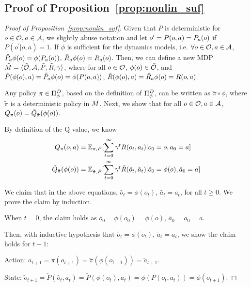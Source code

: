 \subsection{Proof of Proposition~\ref{prop:nonlin_suf}}
\label{proof:nonlin_suf}
\begin{proof}[Proof of Proposition~\ref{prop:nonlin_suf}]

Given that $P$ is deterministic for $o\in\mathcal{O}, a\in\mathcal{A}$, we slightly abuse notation and let $o^\prime = P(o,a) = P_a(o)$ if $P(o^\prime|o,a)=1$.
If $\phi$ is sufficient for the dynamics models, i.e. $\forall o\in\mathcal{O}, a\in\mathcal{A}$, $\hat{P}_a \phi(o) = \phi(P_a(o))$, $\hat{R}_a \phi(o) = R_a(o)$.
Then, we can define a new MDP $\tilde{M} = \langle \tilde{\mathcal{O}}, \mathcal{A}, \tilde{P}, \tilde{R}, \gamma \rangle$, where for all $o\in\mathcal{O}$, $\phi(o)\in\tilde{\mathcal{O}}$, and
$\tilde{P}(\phi(o),a) = \hat{P}_a\phi(o) = \phi(P(o,a))$, $\tilde{R}(\phi(o),a) = \hat{R}_a \phi(o) = R(o,a)$. 

Any policy $\pi\in\Pi_{\phi}^D$, based on the definition of $\Pi_{\phi}^D$, can be written as $\tilde{\pi}\circ\phi$, where $\tilde{\pi}$ is a deterministic policy in $\tilde{M}$.
Next, we show that for all $o\in\mathcal{O}, a\in\mathcal{A}$, $Q_\pi(o)=\tilde{Q}_{\tilde{\pi}}(\phi(o))$.

By definition of the Q value, we know 
\begin{align}
    Q_\pi(o,a) &= \mathbb{E}_{\pi,P}[\sum_{t=0}^\infty \gamma^t R(o_t, a_t)|o_0=o, a_0=a] \label{eq:q_original}\\
    \tilde{Q}_{\tilde{\pi}}(\phi(o)) 
    &= \mathbb{E}_{\tilde{\pi},\tilde{P}}[\sum_{t=0}^\infty \gamma^t \tilde{R}(\tilde{o}_t, \tilde{a}_t)| \tilde{o}_0=\phi(o), \tilde{a}_0=a] \label{eq:q_induced}
\end{align}

We claim that in the above equations, $\tilde{o_t} = \phi(o_t)$, $\tilde{a_t}=a_t$, for all $t\geq 0$. We prove the claim by induction.

When $t=0$, the claim holds as $\tilde{o_0}=\phi(o_0)=\phi(o)$, $\tilde{a_0}=a_0=a$.

Then, with inductive hypothesis that $\tilde{o_t} = \phi(o_t)$, $\tilde{a_t}=a_t$, we show the claim holds for $t+1$:

Action:
$a_{t+1} = \pi(o_{t+1}) = \tilde{\pi}(\phi(o_{t+1})) = \tilde{a}_{t+1}$.

State: $\tilde{o}_{t+1} = \tilde{P}(\tilde{o_t},a_t) = \tilde{P}(\phi(o_t),a_t) = \phi(P(o_t,a_t)) = \phi(o_{t+1})$. 


\end{proof}
